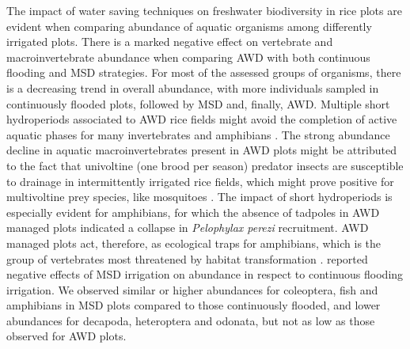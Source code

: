 The impact of water saving techniques on freshwater biodiversity in rice plots are evident when comparing abundance of aquatic organisms among differently irrigated plots. There is a marked negative effect on vertebrate and macroinvertebrate abundance when comparing AWD with both continuous flooding and MSD strategies. For most of the assessed groups of organisms, there is a decreasing trend in overall abundance, with more individuals sampled in continuously flooded plots, followed by MSD and, finally, AWD. Multiple short hydroperiods associated to AWD rice fields might avoid the completion of active aquatic phases for many invertebrates and amphibians \citep{lawler2001}. The strong abundance decline in aquatic macroinvertebrates present in AWD plots might be attributed to the fact that univoltine (one brood per season) predator insects are susceptible to drainage in intermittently irrigated rice fields, which might prove positive for multivoltine prey species, like mosquitoes \citep{mogi1993}. The impact of short hydroperiods is especially evident for amphibians, for which the absence of tadpoles in AWD managed plots indicated a collapse in \textit{Pelophylax perezi} recruitment. AWD managed plots act, therefore, as ecological traps for amphibians, which is the group of vertebrates most threatened by habitat transformation \citep{amphibians}. \cite{watanabe2013} reported negative effects of MSD irrigation on abundance in respect to continuous flooding irrigation. We observed similar or higher abundances for coleoptera, fish and amphibians in MSD plots compared to those continuously flooded, and lower abundances for decapoda, heteroptera and odonata, but not as low as those observed for AWD plots.\\ 

